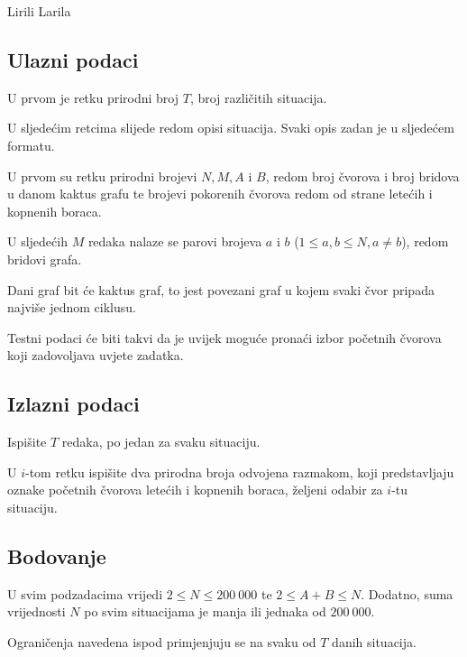 \begin{statement}[
  problempoints=100,
  timelimit=3 sekunde,
  memorylimit=512 MiB,
]{Lirili Larila}
\subsection*{Ulazni podaci}

U prvom je retku prirodni broj $T$, broj različitih situacija.

U sljedećim retcima slijede redom opisi situacija. Svaki opis zadan je u sljedećem formatu.

U prvom su retku prirodni brojevi $N, M, A$ i $B$, redom broj čvorova i broj bridova 
u danom kaktus grafu te brojevi pokorenih čvorova redom od strane letećih i kopnenih boraca.

U sljedećih $M$ redaka nalaze se parovi brojeva $a$ i $b$ ($1 \leq a, b \leq N, a \ne b$), 
redom bridovi grafa. 

Dani graf bit će kaktus graf, to jest povezani graf u kojem svaki čvor pripada najviše jednom 
ciklusu. 

Testni podaci će biti takvi da je uvijek moguće pronaći izbor početnih čvorova koji zadovoljava 
uvjete zadatka. 

\subsection*{Izlazni podaci}

Ispišite $T$ redaka, po jedan za svaku situaciju. 

U $i$-tom retku ispišite dva prirodna broja odvojena razmakom, koji 
predstavljaju oznake početnih čvorova letećih i kopnenih boraca, 
željeni odabir za $i$-tu situaciju. 

\subsection*{Bodovanje}

U svim podzadacima vrijedi $2 \leq N \leq 200~000$ te $2 \leq A + B \leq N$. 
Dodatno, suma vrijednosti $N$ po svim situacijama je manja ili jednaka od $200~000$.

Ograničenja navedena ispod primjenjuju se na svaku od $T$ danih situacija. 


\end{statement}
